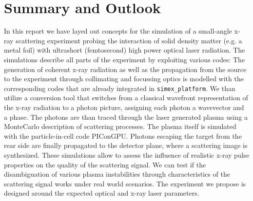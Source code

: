 \documentclass[12pt]{scrartcl}
\begin{document}
\section{Summary and Outlook}
In this report we have layed out concepts for the simulation of a small-angle
x-ray scattering experiment probing the interaction of solid density matter
(e.g. a metal foil) with ultrashort (femtosecond) high power optical laser
radiation. The simulations describe all parts of the experiment by exploiting
various codes: The generation of coherent x-ray radiation as well as the
propagation from the source to the experiment through collimating and focussing
optics is modelled with the corresponding codes that are already integrated in
\texttt{simex\_platform}. We than utilize a conversion tool that switches from a
classical wavefront representation of the x-ray radiation to a photon picture,
assigning each photon a wavevector and a phase. The photons are than traced
through the laser generated plasma using a MonteCarlo description of scattering
processes. The plasma itself
is simulated with the particle-in-cell code PIConGPU. Photons
escaping the target from the rear side are finally propagated to the detector
plane, where a scattering image is synthesized. These simulations allow to
assess the influence of realistic x-ray pulse properties on the quality of the
scattering signal. We can test if the disambiguation of various plasma
instabilities through characteristics of the scattering signal works under real
world scenarios.
The experiment we propose is designed around the expected optical and x-ray
laser parameters.
\end{document}
